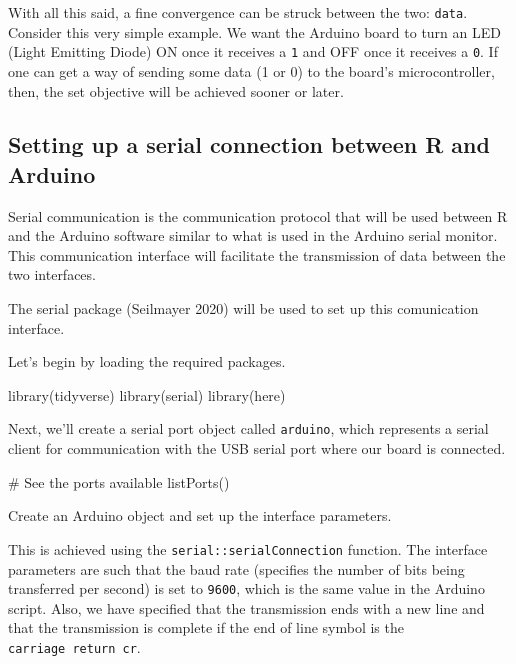 \documentclass[
  letterpaper,
  DIV=11,
  numbers=noendperiod]{scrreprt}
\newenvironment{Shaded}{\begin{snugshade}}{\end{snugshade}}
\newcommand{\CommentTok}[1]{\textcolor[rgb]{0.37,0.37,0.37}{#1}}
\newcommand{\FunctionTok}[1]{\textcolor[rgb]{0.28,0.35,0.67}{#1}}
\newcommand{\NormalTok}[1]{\textcolor[rgb]{0.00,0.23,0.31}{#1}}
\begin{document}
With all this said, a fine convergence can be struck between the two:
\texttt{data}. Consider this very simple example. We want the Arduino
board to turn an LED (Light Emitting Diode) ON once it receives a
\texttt{1} and OFF once it receives a \texttt{0}. If one can get a way
of sending some data (1 or 0) to the board's microcontroller, then, the
set objective will be achieved sooner or later.

\hypertarget{setting-up-a-serial-connection-between-r-and-arduino}{%
\subsection{Setting up a serial connection between R and
Arduino}\label{setting-up-a-serial-connection-between-r-and-arduino}}

Serial communication is the communication protocol that will be used
between R and the Arduino software similar to what is used in the
Arduino serial monitor. This communication interface will facilitate the
transmission of data between the two interfaces.

The serial package (Seilmayer 2020) will be used to set up this
comunication interface.

Let's begin by loading the required packages.

\begin{Shaded}
\begin{Highlighting}[]
\FunctionTok{library}\NormalTok{(tidyverse)}
\FunctionTok{library}\NormalTok{(serial)}
\FunctionTok{library}\NormalTok{(here)}
\end{Highlighting}
\end{Shaded}

Next, we'll create a serial port object called \texttt{arduino}, which
represents a serial client for communication with the USB serial port
where our board is connected.

\begin{Shaded}
\begin{Highlighting}[]
\CommentTok{\# See the ports available}
\FunctionTok{listPorts}\NormalTok{()}
\end{Highlighting}
\end{Shaded}

Create an Arduino object and set up the interface parameters.

This is achieved using the \texttt{serial::serialConnection} function.
The interface parameters are such that the baud rate (specifies the
number of bits being transferred per second) is set to \texttt{9600},
which is the same value in the Arduino script. Also, we have specified
that the transmission ends with a new line and that the transmission is
complete if the end of line symbol is the \texttt{carriage\ return\ cr}.
\end{document}
